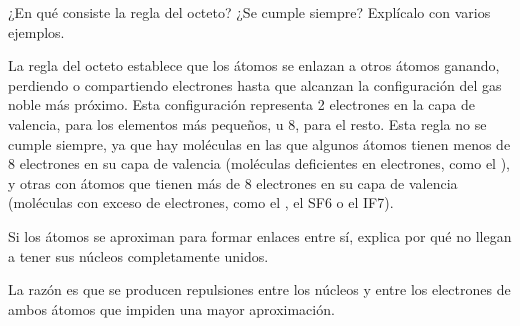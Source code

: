 \begin{question}
    ¿En qué consiste la regla del octeto? ¿Se cumple siempre?
    Explícalo con varios ejemplos.
    \begin{solu}

        La regla del octeto establece que los átomos se enlazan a
        otros átomos ganando, perdiendo o compartiendo electrones
        hasta que alcanzan la configuración del gas noble más
        próximo.
        Esta configuración representa 2 electrones en la
        capa de valencia, para los elementos más pequeños, u 8,
        para el resto.
        Esta regla no se cumple siempre, ya que hay
        moléculas en las que algunos átomos tienen menos de
        8 electrones en su capa de valencia (moléculas deficientes
        en electrones, como el ), y otras con átomos que tienen
        más de 8 electrones en su capa de valencia (moléculas con
        exceso de electrones, como el , el SF6 o el IF7).

    \end{solu}
\end{question}




\begin{question}
    Si los átomos se aproximan para formar enlaces entre sí,
    explica por qué no llegan a tener sus núcleos completamente
    unidos.
    \begin{solu}

        La razón es que se producen repulsiones entre los núcleos
        y entre los electrones de ambos átomos que impiden una
        mayor aproximación.

    \end{solu}
\end{question}




